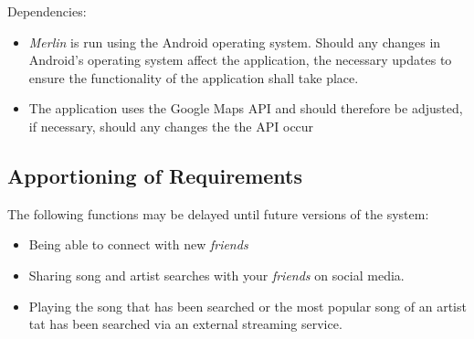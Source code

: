 \documentclass[]{article}
\newcommand{\merlin}{\textit{Merlin }}
\begin{document}
\noindent Dependencies:
\begin{itemize}
	\item \merlin is run using the Android operating system. Should any changes in Android's operating system affect the application, the necessary updates to ensure the functionality of the application shall take place.
	\item The application uses the Google Maps API and should therefore be adjusted, if necessary, should any changes the the API occur
\end{itemize}

\subsection{Apportioning of Requirements}
\label{sub:apportioning_of_requirements}
The following functions may be delayed until future versions of the system:
\begin{itemize}
	\item Being able to connect with new \textit{friends}
	\item Sharing song and artist searches with your \textit{friends} on social media.
	\item Playing the song that has been searched or the most popular song of an artist tat has been searched via an external streaming service.
\end{itemize}

\end{document}
